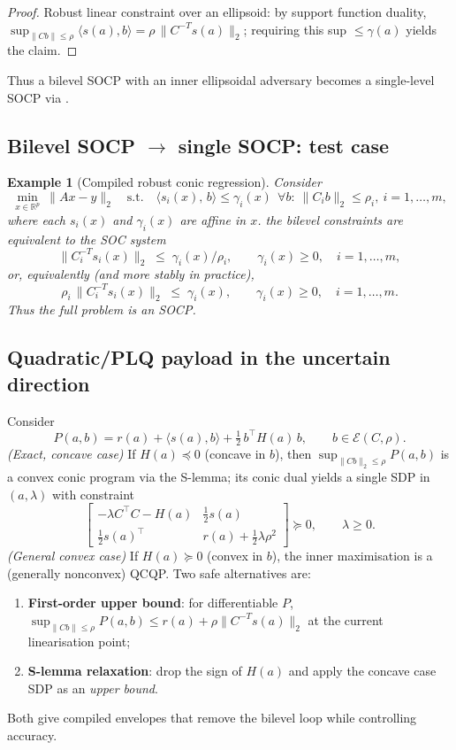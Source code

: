 \documentclass[11pt]{article}
\numberwithin{equation}{section}
\theoremstyle{upright}
\newtheorem{example}[theorem]{Example}
\begin{document}
\begin{proof}
Robust linear constraint over an ellipsoid: by support function duality,
$\sup_{\|Cb\|\le\rho}\langle s(a),b\rangle=\rho\,\|C^{-T}s(a)\|_2$; requiring this sup $\le \gamma(a)$ yields the claim.
\end{proof}

Thus a bilevel SOCP with an inner ellipsoidal adversary becomes a single-level SOCP
via . 


\subsection{Bilevel SOCP \texorpdfstring{$\to$}{→} single SOCP: test case}

\begin{example}[Compiled robust conic regression]\label{ex:compiled-socp}
Consider
\[
\min_{x\in\mathbb R^p}\ \|Ax-y\|_2\quad\text{s.t.}\quad
\langle s_i(x),\,b\rangle \le \gamma_i(x)\ \ \forall b:\ \|C_i b\|_2\le\rho_i,\ i=1,\dots,m,
\]
where each $s_i(x)$ and $\gamma_i(x)$ are affine in $x$. the bilevel constraints are equivalent to the SOC system
\[
\|C_i^{-T}s_i(x)\|_2 \;\le\; \gamma_i(x)/\rho_i,\qquad \gamma_i(x)\ge 0,\quad i=1,\dots,m,
\]
or, equivalently (and more stably in practice),
\[
\rho_i\,\|C_i^{-T}s_i(x)\|_2 \;\le\; \gamma_i(x),\qquad \gamma_i(x)\ge 0,\quad i=1,\dots,m.
\]
Thus the full problem is an SOCP.
\end{example}

\subsection{Quadratic/PLQ payload in the uncertain direction}
Consider
\[
P(a,b)= r(a)+ \langle s(a),b\rangle + \tfrac12\,b^\top H(a)\,b,\qquad b\in\mathcal E(C,\rho).
\]
\emph{(Exact, concave case)} If $H(a)\preceq 0$ (concave in $b$), then
$\sup_{\|Cb\|_2\le\rho}P(a,b)$ is a convex conic program via the S-lemma; its conic dual yields a
single SDP in $(a,\lambda)$ with constraint
\[
\begin{bmatrix}
-\lambda C^\top C - H(a) & \tfrac12 s(a)\\
\tfrac12 s(a)^\top & r(a)+\tfrac12\lambda \rho^2
\end{bmatrix}\succeq 0,\qquad \lambda\ge 0.
\]
\emph{(General convex case)} If $H(a)\succeq 0$ (convex in $b$), the inner maximisation is a (generally nonconvex) QCQP.
Two safe alternatives are:
\begin{enumerate}[itemsep=0.25ex,label=(\alph*)]
\item \textbf{First-order upper bound}: for differentiable $P$, 
$\sup_{\|Cb\|\le\rho}P(a,b)\le r(a)+\rho\|C^{-T}s(a)\|_2$ at the current linearisation point;
\item \textbf{S-lemma relaxation}: drop the sign of $H(a)$ and apply the concave case SDP as an \emph{upper bound}.
\end{enumerate}
Both give compiled envelopes that remove the bilevel loop while controlling accuracy. 
\end{document}

